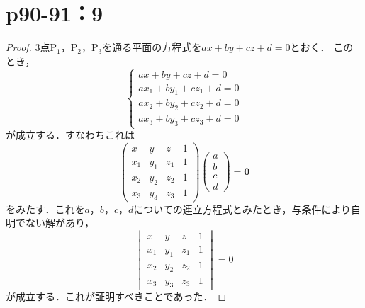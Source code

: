 \documentclass[a4paper,10pt,fleqn]{ltjsarticle}
\begin{document}
\newpage

\section*{p90-91：9}

\begin{tleftbar}
    \begin{proof}
        3点$\mathrm{P}_1$，$\mathrm{P_2}$，$\mathrm{P_3}$を通る平面の方程式を$ax+by+cz+d=0$とおく．
        このとき，
        \[
            \begin{cases}
                ax+by+cz + d =0         \\
                ax_1 + by_1 +cz_1 +d =0 \\
                ax_2 + by_2 +cz_2 +d =0 \\
                ax_3 + by_3 +cz_3 +d =0
            \end{cases}
        \]
        が成立する．すなわちこれは
        \[
            \begin{pmatrix}
                x   & y   & z   & 1 \\
                x_1 & y_1 & z_1 & 1 \\
                x_2 & y_2 & z_2 & 1 \\
                x_3 & y_3 & z_3 & 1
            \end{pmatrix}
            \begin{pmatrix}
                a \\
                b \\
                c \\
                d
            \end{pmatrix}
            = \bm{0}
        \]
        をみたす．これを$a$，$b$，$c$，$d$についての連立方程式とみたとき，与条件により自明でない解があり，
        \[
            \begin{vmatrix}
                x   & y   & z   & 1 \\
                x_1 & y_1 & z_1 & 1 \\
                x_2 & y_2 & z_2 & 1 \\
                x_3 & y_3 & z_3 & 1
            \end{vmatrix}
            =0
        \]
        が成立する．これが証明すべきことであった．
    \end{proof}
\end{tleftbar}

\newpage
\end{document}
